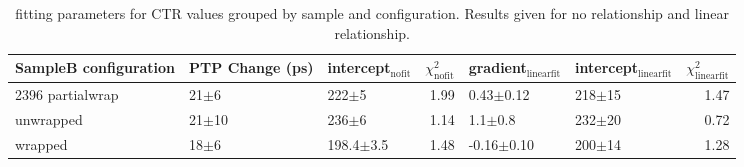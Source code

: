 \begin{table}
\caption{\label{tab:ctrfit-20-results} fitting parameters for CTR values grouped by sample and configuration. Results given for no relationship and linear relationship.}
\begin{tabular}{lllrllr}
\hline
SampleB configuration & PTP Change (ps) & intercept$_\text{nofit}$ &  $\chi^2_\text{nofit}$ & gradient$_\text{linearfit}$ & intercept$_\text{linearfit}$ &  $\chi^2_\text{linearfit}$ \\
\hline
2396    partialwrap   &   21$\pm$6 &       222$\pm$5 &                   1.99 &       0.43$\pm$0.12 &         218$\pm$15 &                    1.47 \\
        unwrapped     &  21$\pm$10 &       236$\pm$6 &                   1.14 &         1.1$\pm$0.8 &         232$\pm$20 &                    0.72 \\
        wrapped       &   18$\pm$6 &   198.4$\pm$3.5 &                   1.48 &      -0.16$\pm$0.10 &         200$\pm$14 &                    1.28 \\
\hline
\end{tabular}
\end{table}